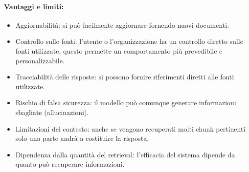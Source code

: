 \paragraph{Vantaggi e limiti:}

\begin{itemize}
  \item [\textcolor{green}{\ding{51}}] Aggiornabilità: si può facilmente aggiornare fornendo nuovi documenti. 
 \item [\textcolor{green}{\ding{51}}] Controllo sulle fonti: l'utente o l'organizzazione ha un controllo diretto sulle fonti utilizzate, questo permette un comportamento più prevedibile e personalizzabile.
    \item [\textcolor{green}{\ding{51}}] Tracciabilità delle risposte: si possono fornire riferimenti diretti alle fonti utilizzate. 
       \item [\textcolor{red}{\ding{55}}] Rischio di falsa sicurezza: il modello può comunque generare informazioni sbagliate (allucinazioni). 
          \item [\textcolor{red}{\ding{55}}] Limitazioni del contesto: anche se vengono recuperati molti chunk pertinenti solo una parte andrà a costituire la risposta. 

             \item [\textcolor{red}{\ding{55}}] Dipendenza dalla quantità del retrieval: l'efficacia del sistema dipende da quanto può recuperare informazioni. 
\end{itemize}

